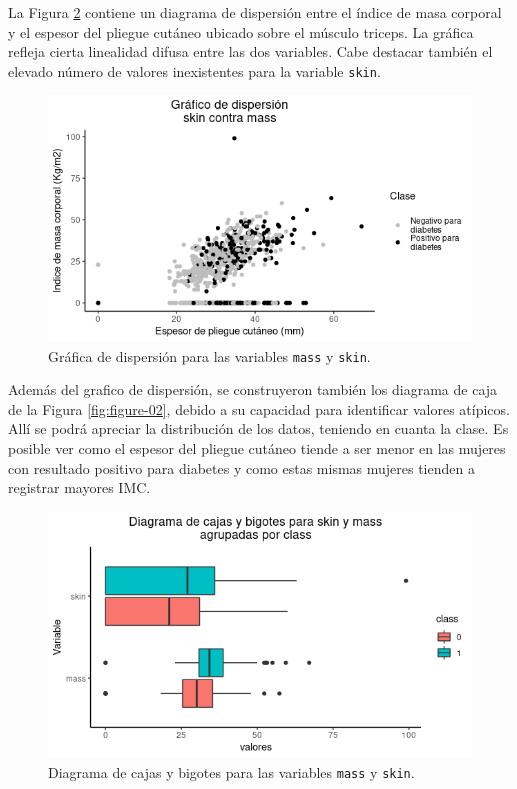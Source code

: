 \documentclass[11pt,letterpaper]{article}
\begin{document}
La Figura \ref{fig:figure-01} contiene un diagrama de dispersión entre el índice de masa corporal y el espesor del pliegue cutáneo ubicado sobre el músculo triceps. La gráfica refleja cierta linealidad difusa entre las dos variables. Cabe destacar también el elevado número de valores inexistentes para la variable {\tt skin}.


\begin{figure}[h]
\centering
\includegraphics[scale=0.7]{scatter0.png}
\caption{Gráfica de dispersión para las variables {\tt mass} y {\tt skin}.}
\label{fig:figure-01}
\end{figure}

Además del grafico de dispersión, se construyeron también los diagrama de caja de la Figura \ref{fig:figure-02}, debido a su capacidad para identificar valores atípicos. Allí se podrá apreciar la distribución de los datos, teniendo en cuanta la clase. Es posible ver como el espesor del pliegue cutáneo tiende a ser menor en las mujeres con resultado positivo para diabetes y como estas mismas mujeres tienden  a registrar mayores IMC.

\begin{figure}
\centering
\includegraphics[scale=0.6]{boxplot0.png}
\caption{Diagrama de cajas y bigotes para las variables {\tt mass} y {\tt skin}.}
\label{fig:figure-01} 
\end{figure}
\end{document}
